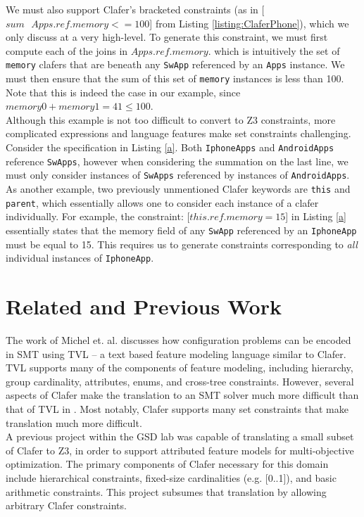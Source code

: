 \documentclass{article}
\begin{document}
We must also support Clafer's bracketed constraints (as in [$sum\text{ }Apps.ref.memory <= 100$] from Listing \ref{listing:ClaferPhone}), which we only discuss at a very high-level. To generate this constraint, we must first compute each of the joins in $Apps.ref.memory$. which is intuitively the set of \texttt{memory} clafers that are beneath any \texttt{SwApp} referenced by an \texttt{Apps} instance. We must then ensure that the sum of this set of \texttt{memory} instances is less than 100. Note that this is indeed the case in our example, since $memory0 + memory1 =   41 \le 100$.\\
\indent Although this example is not too difficult to convert to Z3 constraints, more complicated expressions and language features make set constraints challenging. Consider the specification in Listing \ref{a}. Both \texttt{IphoneApps} and \texttt{AndroidApps} reference \texttt{SwApps}, however when considering the summation on the last line, we must only consider instances of \texttt{SwApps} referenced by instances of \texttt{AndroidApps}. As another example, two previously unmentioned Clafer keywords are \texttt{this} and \texttt{parent}, which essentially allows one to consider each instance of a clafer individually. For example, the constraint: [$this.ref.memory = 15$] in Listing \ref{a}  essentially states that the memory field of any \texttt{SwApp} referenced by an \texttt{IphoneApp} must be equal to 15. This requires us to generate constraints corresponding to \textit{all} individual instances of \texttt{IphoneApp}.





\section{Related and Previous Work}
The work of Michel et. al. \cite{Michel2012} discusses how configuration problems can be encoded in SMT using TVL \cite{Classen2011} -- a text based feature modeling language similar to Clafer. TVL supports many of the components of feature modeling, including hierarchy, group cardinality, attributes, enums, and cross-tree constraints. However, several aspects of Clafer make the translation to an SMT solver much more difficult than that of TVL in \cite{Michel2012}. Most notably, Clafer supports many set constraints that make translation much more difficult. \\
\indent  A previous project \cite{Olaechea2013} within the GSD lab was capable of translating a small subset of Clafer to Z3, in order to support attributed feature models for multi-objective optimization. The primary components of Clafer necessary for this domain include hierarchical constraints, fixed-size cardinalities (e.g. [0..1]), and basic arithmetic constraints. This project subsumes that translation by allowing arbitrary Clafer constraints.
\end{document}
